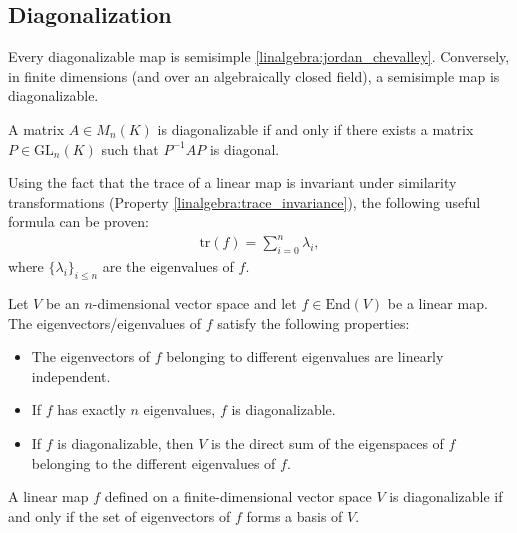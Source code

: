 \subsection{Diagonalization}

    \begin{property}
        Every diagonalizable map is semisimple \ref{linalgebra:jordan_chevalley}. Conversely, in finite dimensions (and over an algebraically closed field), a semisimple map is diagonalizable.
    \end{property}

    \begin{theorem}\label{linalgebra:theorem:diagonalizable_PQP}
        A matrix $A\in M_n(K)$ is diagonalizable if and only if there exists a matrix $P\in\mathrm{GL}_n(K)$ such that $P^{-1}AP$ is diagonal.
    \end{theorem}
    \begin{result}
        Using the fact that the trace of a linear map is invariant under similarity transformations (Property \ref{linalgebra:trace_invariance}), the following useful formula can be proven:
        \begin{gather}
            \text{tr}(f) = \sum_{i=0}^n\lambda_i,
        \end{gather}
        where $\{\lambda_i\}_{i\leq n}$ are the eigenvalues of $f$.
    \end{result}

    \begin{property}\label{linalgebra:diagonalization_properties}
        Let $V$ be an $n$-dimensional vector space and let $f\in\text{End}(V)$ be a linear map. The eigenvectors/eigenvalues of $f$ satisfy the following properties:
        \begin{itemize}
            \item The eigenvectors of $f$ belonging to different eigenvalues are linearly independent.
            \item If $f$ has exactly $n$ eigenvalues, $f$ is diagonalizable.
            \item If $f$ is diagonalizable, then $V$ is the direct sum of the eigenspaces of $f$ belonging to the different eigenvalues of $f$.
        \end{itemize}
    \end{property}
    \begin{theorem}\label{linalgebra:theorem:diagonalizable_basis}
        A linear map $f$ defined on a finite-dimensional vector space $V$ is diagonalizable if and only if the set of eigenvectors of $f$ forms a basis of $V$.
    \end{theorem}

